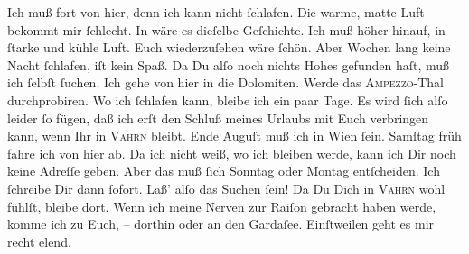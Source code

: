 \pstart
           Ich muß fort von hier, denn ich kann nicht ſchlafen. Die warme, matte Luft bekommt
               mir ſchlecht. In \label{K_L03076-1v}\label{K_L03076-1} wäre es dieſelbe
               Geſchichte. Ich muß höher hinauf, in ſtarke und kühle Luft. Euch wiederzuſehen wäre ſchön. Aber Wochen
               lang keine Nacht ſchlafen, iſt kein Spaß. Da Du alſo noch nichts Hohes gefunden haſt,
               muß ich ſelbſt ſuchen. Ich gehe von hier in die Dolomiten. Werde das \textsc{Ampezzo}-Thal durchprobiren. Wo ich ſchlafen kann,
               bleibe ich ein paar Tage. Es wird ſich alſo leider ſo fügen, {\pb}daß ich erſt den Schluß meines Urlaubs mit Euch verbringen kann, wenn Ihr
               in \textsc{Vahrn} bleibt.  Ende Auguſt muß ich in Wien ſein. Samſtag{ }früh fahre ich von hier ab. Da ich nicht weiß, wo ich bleiben werde,
               kann ich Dir noch keine Adreſſe  geben. Aber das muß
               ſich Sonntag oder Montag entſcheiden. Ich ſchreibe Dir dann ſofort. Laß’ alſo das Suchen
               ſein! Da Du Dich in \textsc{Vahrn} wohl fühlſt, bleibe dort. Wenn ich meine Nerven zur Raiſon gebracht haben
               werde, komme ich zu Euch, –
                  dorthin oder an den Gardaſee. Einſtweilen geht es mir recht elend.
